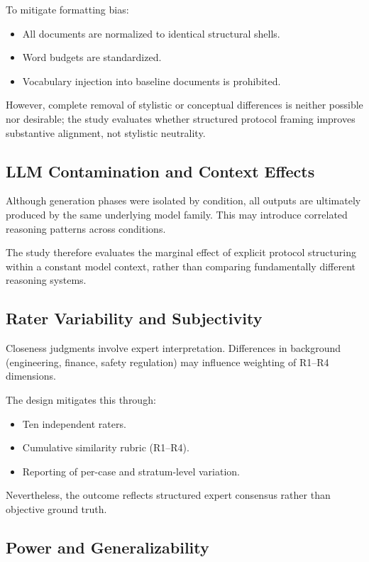 To mitigate formatting bias:
\begin{itemize}
    \item All documents are normalized to identical structural shells.
    \item Word budgets are standardized.
    \item Vocabulary injection into baseline documents is prohibited.
\end{itemize}

However, complete removal of stylistic or conceptual differences is neither possible nor desirable; the study evaluates whether structured protocol framing improves substantive alignment, not stylistic neutrality.

\subsection{LLM Contamination and Context Effects}

Although generation phases were isolated by condition, all outputs are ultimately produced by the same underlying model family. This may introduce correlated reasoning patterns across conditions. 

The study therefore evaluates the marginal effect of explicit protocol structuring within a constant model context, rather than comparing fundamentally different reasoning systems.

\subsection{Rater Variability and Subjectivity}

Closeness judgments involve expert interpretation. Differences in background (engineering, finance, safety regulation) may influence weighting of R1--R4 dimensions. 

The design mitigates this through:
\begin{itemize}
    \item Ten independent raters.
    \item Cumulative similarity rubric (R1--R4).
    \item Reporting of per-case and stratum-level variation.
\end{itemize}

Nevertheless, the outcome reflects structured expert consensus rather than objective ground truth.

\subsection{Power and Generalizability}

